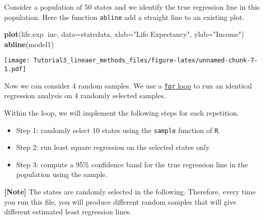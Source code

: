 \documentclass[]{article}
\newenvironment{Shaded}{\begin{snugshade}}{\end{snugshade}}
\newcommand{\KeywordTok}[1]{\textcolor[rgb]{0.13,0.29,0.53}{\textbf{#1}}}
\newcommand{\DataTypeTok}[1]{\textcolor[rgb]{0.13,0.29,0.53}{#1}}
\newcommand{\StringTok}[1]{\textcolor[rgb]{0.31,0.60,0.02}{#1}}
\newcommand{\OperatorTok}[1]{\textcolor[rgb]{0.81,0.36,0.00}{\textbf{#1}}}
\newcommand{\NormalTok}[1]{#1}
\providecommand{\tightlist}{%
  \setlength{\itemsep}{0pt}\setlength{\parskip}{0pt}}
\begin{document}
Consider a population of 50 states and we identify the true regression
line in this population. Here the function \texttt{abline} add a
straight line to an existing plot.

\begin{Shaded}
\begin{Highlighting}[]
\KeywordTok{plot}\NormalTok{(life.exp}\OperatorTok{~}\NormalTok{inc, }\DataTypeTok{data=}\NormalTok{statedata,}
      \DataTypeTok{xlab=}\StringTok{"Life Expectancy"}\NormalTok{, }\DataTypeTok{ylab=}\StringTok{"Income"}\NormalTok{)}
\KeywordTok{abline}\NormalTok{(model1)}
\end{Highlighting}
\end{Shaded}

\texttt{[image: Tutorial3\_lineaer\_methods\_files/figure-latex/unnamed-chunk-7-1.pdf]}

Now we can consider 4 random samples. We use a
\href{https://en.wikipedia.org/wiki/For_loop}{\texttt{for} loop} to run
an identical regression analysis on 4 randomly selected samples.

Within the loop, we will implement the following steps for each
repetition.

\begin{itemize}
\tightlist
\item
  Step 1: randomly select 10 states using the \texttt{sample} function
  of \texttt{R}.
\item
  Step 2: run least square regression on the selected states only
\item
  Step 3: compute a 95\% confidence band for the true regression line in
  the population using the sample.
\end{itemize}

\textbf{{[}Note{]}} The states are randomly selected in the following.
Therefore, every time you run this file, you will produce different
random samples that will give different estimated least regression
lines.
\end{document}
